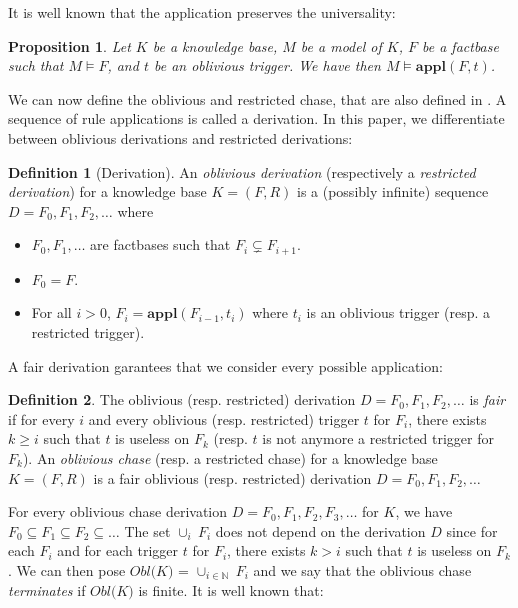 \documentclass{article}
\newtheorem{proposition}{Proposition}[section]
\theoremstyle{definition}
\newtheorem{definition}{Definition}[section]
\theoremstyle{remark}
\def \N {\mathbb N}
\newcommand{\Appl}{\textbf{appl}}
\begin{document}
It is well known that the application preserves the universality:

\begin{proposition} \label{universality-application}
	Let $K$ be a knowledge base, $M$ be a model of $K$, $F$ be a factbase such that $M \vDash F$, and $t$ be an oblivious trigger. We have then $M \vDash \Appl(F,t)$.
\end{proposition}


We can now define the oblivious and restricted chase, that are also defined in \cite{obl_res}. A sequence of rule applications is called a derivation. In this paper, we differentiate between oblivious derivations and restricted derivations:

\begin{definition}[Derivation]
An \emph{oblivious derivation} (respectively a \emph{restricted derivation}) for a knowledge base $K= (F,R)$ is a (possibly infinite) sequence $D=F_0,F_1,F_2,\ldots$ where 
\begin{itemize}
\item $F_0,F_1,\ldots$ are factbases such that $F_i \subsetneq F_{i+1}$.
\item $F_0 = F$.
\item For all $i > 0$, $F_{i}= \Appl(F_{i-1},t_i)$ where $t_i$ is an oblivious trigger (resp. a restricted trigger).
\end{itemize}
\end{definition}

A fair derivation garantees that we consider every possible application:

\begin{definition}
The oblivious (resp. restricted) derivation $D=F_0,F_1,F_2,\ldots$ is \emph{fair} if for every $i$ and every oblivious (resp. restricted) trigger $t$ for $F_i$, there exists $k \geq i$ such that $t$ is useless on $F_k$ (resp. $t$ is not anymore a restricted trigger for $F_k$). An \emph{oblivious chase} (resp. a restricted chase) for a knowledge base $K= (F,R)$ is a fair oblivious (resp. restricted) derivation $D=F_0,F_1,F_2,\ldots$ 
\end{definition}

For every oblivious chase derivation $D = F_0,F_1,F_2,F_3,\ldots$ for $K$, we have $F_0 \subseteq F_1 \subseteq F_2 \subseteq \ldots$ The set $\cup_i~F_i$ does not depend on the derivation $D$ since for each $F_i$ and for each trigger $t$ for $F_i$, there exists $k>i$ such that $t$ is useless on $F_k$. We can then pose \emph{$\textit{Obl(K)}$} = $\cup_{i \in \N}~F_i$ and we say that the oblivious chase \emph{terminates} if $\textit{Obl(K)}$ is finite. It is well known that:
\end{document}
